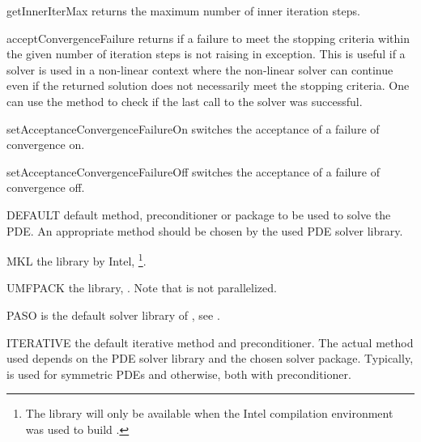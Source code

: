 \begin{methoddesc}[SolverOptions]{getInnerIterMax}{}
returns the maximum number of inner iteration steps.
\end{methoddesc}

\begin{methoddesc}[SolverOptions]{acceptConvergenceFailure}{}
returns \True if a failure to meet the stopping criteria within the given
number of iteration steps is not raising in exception. This is useful
if a solver is used in a non-linear context where the non-linear solver can
continue even if the returned solution does not necessarily meet the stopping
criteria. One can use the  method to check if the
last call to the solver was successful.
\end{methoddesc}

\begin{methoddesc}[SolverOptions]{setAcceptanceConvergenceFailureOn}{}
switches the acceptance of a failure of convergence on.
\end{methoddesc}

\begin{methoddesc}[SolverOptions]{setAcceptanceConvergenceFailureOff}{}
switches the acceptance of a failure of convergence off.
\end{methoddesc}
    
\begin{memberdesc}[SolverOptions]{DEFAULT}
default method, preconditioner or package to be used to solve the PDE.
An appropriate method should be chosen by the used PDE solver library.
\end{memberdesc}

\begin{memberdesc}[SolverOptions]{MKL}
the \MKL library by Intel, \footnote{The \MKL library will only be
available when the Intel compilation environment was used to build \escript.}.
\end{memberdesc}

\begin{memberdesc}[SolverOptions]{UMFPACK}
the \UMFPACK library, . Note that \UMFPACK is not parallelized.
\end{memberdesc}

\begin{memberdesc}[SolverOptions]{PASO}
\PASO is the default solver library of \finley, see .
\end{memberdesc}

\begin{memberdesc}[SolverOptions]{ITERATIVE}
the default iterative method and preconditioner. The actual method used
depends on the PDE solver library and the chosen solver package.
Typically, \PCG is used for symmetric PDEs and \BiCGStab otherwise, both with
\JACOBI preconditioner.
\end{memberdesc}

